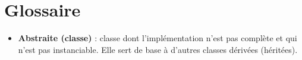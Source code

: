 \section*{Glossaire} %

\begin{itemize}
    \item \textbf{Abstraite (classe)} :  classe dont l'implémentation n'est pas complète et qui n'est pas instanciable. Elle sert de base à d'autres classes dérivées (héritées).

\end{itemize}
